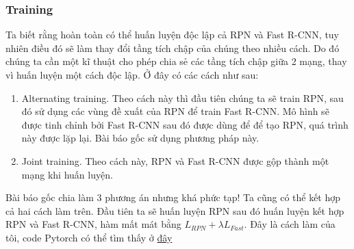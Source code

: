 \documentclass{article}
\begin{document}
\subsubsection{Training}
Ta biết rằng hoàn toàn có thể huấn luyện độc lập cả RPN và Fast R-CNN, tuy nhiên điều đó sẽ làm thay đổi tầng tích chập của chúng theo nhiều cách. Do đó chúng ta cần một kĩ thuật cho phép chia sẻ các tầng tích chập giữa 2 mạng, thay vì huấn luyện một cách độc lập. Ở đây có các cách như sau: 
\begin{enumerate}
    \item Alternating training. Theo cách này thì đầu tiên chúng ta sẽ train RPN, sau đó sử dụng các vùng đề xuất của RPN để train Fast R-CNN. Mô hình sẽ được tinh chỉnh bởi Fast R-CNN sau đó được dùng để để tạo RPN, quá trình này được lặp lại. Bài báo gốc sử dụng phương pháp này.
    \item Joint training. Theo cách này, RPN và Fast R-CNN được gộp thành một mạng khi huấn luyện.
\end{enumerate}
Bài báo gốc chia làm 3 phương án nhưng khá phức tạp! Ta cũng có thể kết hợp cả hai cách làm trên. Đầu tiên ta sẽ huấn luyện RPN sau đó huấn luyện kết hợp RPN và Fast R-CNN, hàm mất mát bằng $L_{RPN}+\lambda L_{Fast}$. Đây là cách làm của tôi, code Pytorch có thể tìm thấy ở \href{https://github.com/thuantn210823/Computer-Vision-IPSAL-LAB-}{đây}
\end{document}
